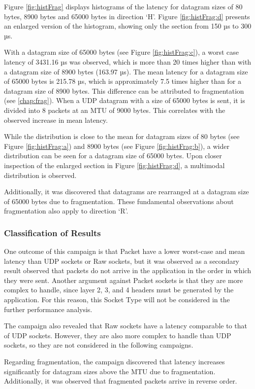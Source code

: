 Figure \ref{fig:histFrag} displays histograms of the latency for datagram sizes of 80 bytes, 8900 bytes and 65000 bytes in direction `H'. Figure \ref{fig:histFrag:d} presents an enlarged version of the histogram, showing only the section from 150 µs to 300 µs.

With a datagram size of 65000 bytes (see Figure \ref{fig:histFrag:c}), a worst case latency of 3431.16 µs was observed, which is more than 20 times higher than with a datagram size of 8900 bytes (163.97 µs). The mean latency for a datagram size of 65000 bytes is 215.78 µs, which is approximately 7.5 times higher than for a datagram size of 8900 bytes. This difference can be attributed to fragmentation (see \ref{chap:frag}). When a UDP datagram with a size of 65000 bytes is sent, it is divided into 8 packets at an MTU of 9000 bytes. This correlates with the observed increase in mean latency.

While the distribution is close to the mean for datagram sizes of 80 bytes (see Figure \ref{fig:histFrag:a}) and 8900 bytes (see Figure \ref{fig:histFrag:b}), a wider distribution can be seen for a datagram size of 65000 bytes. Upon closer inspection of the enlarged section in Figure \ref{fig:histFrag:d}, a multimodal distribution is observed.

Additionally, it was discovered that datagrams are rearranged at a datagram size of 65000 bytes due to fragmentation.  These fundamental observations about fragmentation also apply to direction `R'.

\subsubsection{Classification of Results}
One outcome of this campaign is that Packet have a lower worst-case and mean latency than UDP sockets or Raw sockets, but it was observed as a secondary result observed that packets do not arrive in the application in the order in which they were sent. Another argument against Packet sockets is that they are more complex to handle, since layer 2, 3, and 4 headers must be generated by the application. For this reason, this Socket Type will not be considered in the further performance analysis.

The campaign also revealed that Raw sockets have a latency comparable to that of UDP sockets. However, they are also more complex to handle than UDP sockets, so they are not considered in the following campaigns.

Regarding fragmentation, the campaign discovered that latency increases significantly for datagram sizes above the MTU due to fragmentation. Additionally, it was observed that fragmented packets arrive in reverse order.


